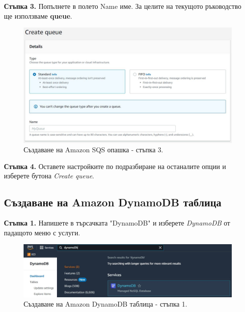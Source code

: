 \documentclass[12pt]{article}
\begin{document}
\noindent\textbf{Стъпка 3.} Попълнете в полето Name име. За целите на текущото ръководство ще използваме \textbf{queue}.
\begin{figure}[h!]
\centering
    \includegraphics[scale=0.4]{instructions/sqs/3.JPG}
  \caption{Създаване на Amazon SQS опашка - стъпка 3.}
\end{figure}

\noindent\textbf{Стъпка 4.} Оставете настройките по подразбиране на останалите опции и изберете бутона \textit{Create queue}.

\clearpage
\pagebreak


\subsection{Създаване на Amazon DynamoDB таблица}
\noindent\textbf{Стъпка 1.} Напишете в търсачката "DynamoDB" и изберете \textit{DynamoDB} от падащото меню с услуги.
\begin{figure}[h!]
\centering
    \includegraphics[scale=0.45]{instructions/dynamodb/1.JPG}
  \caption{Създаване на Amazon DynamoDB таблица - стъпка 1.}
\end{figure}
\end{document}
